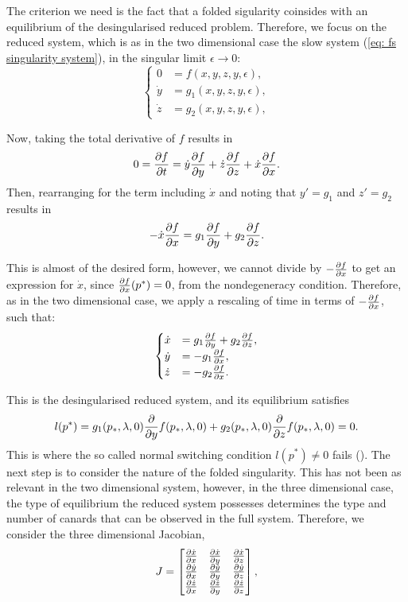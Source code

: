 The criterion we need is the fact that a folded sigularity coinsides with an equilibrium of the desingularised reduced problem.
Therefore, we focus on the reduced system, which is as in the two dimensional case the slow system (\ref{eq: fs singularity system}), in the singular limit $\epsilon \to 0$:
\begin{equation}
\begin{cases}
0 &=f(x,y,z,y,\epsilon),\\
\dot{y}&=g_1(x,y,z,y,\epsilon),\\
\dot{z}&=g_2(x,y,z,y,\epsilon),
\end{cases}\label{eq: fs singularity systemeps0}
\end{equation}

Now, taking the total derivative of $f$ results in
\begin{align*}
0 = \pd{f}{t} =\dot{y}\pd{f}{y}+\dot{z}\pd{f}{z} + \dot{x}\pd{f}{x}.
\end{align*}
Then, rearranging for the term including $\dot{x}$ and noting that $ y'=g_1 $ and $ z'=g_2 $ results in
\begin{align*}
-\dot{x}\pd{f}{x} = g_1 \pd{f}{y}+ g_2\pd{f}{z}.
\end{align*}

This is almost of the desired form, however, we cannot divide by $-\pd{f}{x}$ to get an expression for $\dot{x}$, since $\pd{f}{x}(p^*)=0$, from the nondegeneracy condition.
Therefore, as in the two dimensional case, we apply a rescaling of time in terms of $-\pd{f}{x}$, such that:
\begin{equation} \label{somegenericthreedim}
\begin{cases}
\dot{x}&=g_1\pd{f}{y}+g_2\pd{f}{z},\\
\dot{y}&=-g_1\pd{f}{x},\\
\dot{z}&=-g_2\pd{f}{x}.
\end{cases}
\end{equation}

This is the desingularised reduced system, and its equilibrium satisfies
\begin{align*}
l(p^*)= g_1(p_*,\lambda,0)\pd{}{y}f(p_*,\lambda,0)+g_2(p_*,\lambda,0)\pd{}{z}f(p_*,\lambda,0)=0.
\end{align*}
This is where the so called normal switching condition $l(p^*) \neq 0$ fails (\citep{Kuehn}).
The next step is to consider the nature of the folded singularity. This has not been as relevant in the two dimensional system, however, in the three dimensional case, the type of equilibrium the reduced system possesses determines the type and number of canards that can be observed in the full system.
Therefore, we consider the three dimensional Jacobian,
\begin{equation}
J=\begin{bmatrix}
\pd{\dot{x}}{x}&\pd{\dot{x}}{y}&\pd{\dot{x}}{z}\\
\pd{\dot{y}}{x}&\pd{\dot{y}}{y}&\pd{\dot{y}}{z}\\
\pd{\dot{z}}{x}&\pd{\dot{z}}{y}&\pd{\dot{z}}{z}\\
\end{bmatrix},
\end{equation}

